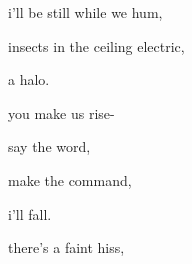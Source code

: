 \documentclass[extrafontsizes, 48pt]{memoir}
\newcommand\blankpage{%
    \null
    \thispagestyle{empty}%
    \addtocounter{page}{-1}%
    \newpage}
\begin{document}
	\begin{minipage}{.6\textwidth}
	i'll be still while we hum,
	\end{minipage}
	\newpage

	\begin{minipage}{.6\textwidth}
	insects in the ceiling electric,
	\end{minipage}
	\newpage

	\begin{minipage}{.6\textwidth}
	a halo.
	\afterpage{\blankpage}
	\end{minipage}
	\newpage

	\begin{minipage}{.6\textwidth}
	you make us rise-
	\end{minipage}
	\newpage

	\begin{minipage}{.6\textwidth}
	say the word,
	\end{minipage}
	\newpage

	\begin{minipage}{.6\textwidth}
	make the command,
	\end{minipage}
	\newpage

	\begin{minipage}{.6\textwidth}
	i'll fall.
	\afterpage{\blankpage}
	\end{minipage}
	\newpage

	\begin{minipage}{.6\textwidth}
	there's a faint hiss,
	\end{minipage}
	\newpage
\end{document}
